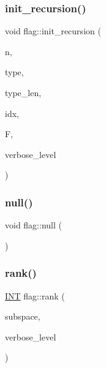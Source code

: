 \mbox{\label{classflag_a25c6b69bd5cc648bba8bea35a3f88369}} 
\subsubsection{\texorpdfstring{init\+\_\+recursion()}{init\_recursion()}}
{\footnotesize\ttfamily void flag\+::init\+\_\+recursion (\begin{DoxyParamCaption}\item[{\mbox{\hyperlink{galois_8h_a09fddde158a3a20bd2dcadb609de11dc}{I\+NT}}}]{n,  }\item[{\mbox{\hyperlink{galois_8h_a09fddde158a3a20bd2dcadb609de11dc}{I\+NT}} $\ast$}]{type,  }\item[{\mbox{\hyperlink{galois_8h_a09fddde158a3a20bd2dcadb609de11dc}{I\+NT}}}]{type\+\_\+len,  }\item[{\mbox{\hyperlink{galois_8h_a09fddde158a3a20bd2dcadb609de11dc}{I\+NT}}}]{idx,  }\item[{\mbox{\hyperlink{classfinite__field}{finite\+\_\+field}} $\ast$}]{F,  }\item[{\mbox{\hyperlink{galois_8h_a09fddde158a3a20bd2dcadb609de11dc}{I\+NT}}}]{verbose\+\_\+level }\end{DoxyParamCaption})}

\mbox{\label{classflag_aca06508fba1f69355f26c2e4cfc1f9b7}} 
\subsubsection{\texorpdfstring{null()}{null()}}
{\footnotesize\ttfamily void flag\+::null (\begin{DoxyParamCaption}{ }\end{DoxyParamCaption})}

\mbox{\label{classflag_ae4c705cfd1fbab331edfad846879fdb9}} 
\subsubsection{\texorpdfstring{rank()}{rank()}}
{\footnotesize\ttfamily \mbox{\hyperlink{galois_8h_a09fddde158a3a20bd2dcadb609de11dc}{I\+NT}} flag\+::rank (\begin{DoxyParamCaption}\item[{\mbox{\hyperlink{galois_8h_a09fddde158a3a20bd2dcadb609de11dc}{I\+NT}} $\ast$}]{subspace,  }\item[{\mbox{\hyperlink{galois_8h_a09fddde158a3a20bd2dcadb609de11dc}{I\+NT}}}]{verbose\+\_\+level }\end{DoxyParamCaption})}

